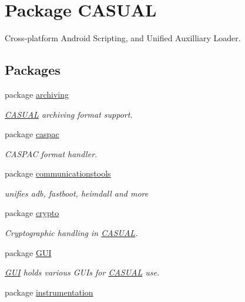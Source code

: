 \hypertarget{namespace_c_a_s_u_a_l}{\section{Package C\-A\-S\-U\-A\-L}
\label{namespace_c_a_s_u_a_l}
}


Cross-\/platform Android Scripting, and Unified Auxilliary Loader.  


\subsection*{Packages}
\begin{DoxyCompactItemize}
\item 
package \hyperlink{namespace_c_a_s_u_a_l_1_1archiving}{archiving}
\begin{DoxyCompactList}\small\item\em \hyperlink{namespace_c_a_s_u_a_l}{C\-A\-S\-U\-A\-L} archiving format support. \end{DoxyCompactList}\item 
package \hyperlink{namespace_c_a_s_u_a_l_1_1caspac}{caspac}
\begin{DoxyCompactList}\small\item\em C\-A\-S\-P\-A\-C format handler. \end{DoxyCompactList}\item 
package \hyperlink{namespace_c_a_s_u_a_l_1_1communicationstools}{communicationstools}
\begin{DoxyCompactList}\small\item\em unifies adb, fastboot, heimdall and more \end{DoxyCompactList}\item 
package \hyperlink{namespace_c_a_s_u_a_l_1_1crypto}{crypto}
\begin{DoxyCompactList}\small\item\em Cryptographic handling in \hyperlink{namespace_c_a_s_u_a_l}{C\-A\-S\-U\-A\-L}. \end{DoxyCompactList}\item 
package \hyperlink{namespace_c_a_s_u_a_l_1_1_g_u_i}{G\-U\-I}
\begin{DoxyCompactList}\small\item\em \hyperlink{namespace_c_a_s_u_a_l_1_1_g_u_i}{G\-U\-I} holds various G\-U\-Is for \hyperlink{namespace_c_a_s_u_a_l}{C\-A\-S\-U\-A\-L} use. \end{DoxyCompactList}\item 
package \hyperlink{namespace_c_a_s_u_a_l_1_1instrumentation}{instrumentation}

\end{DoxyCompactItemize}
